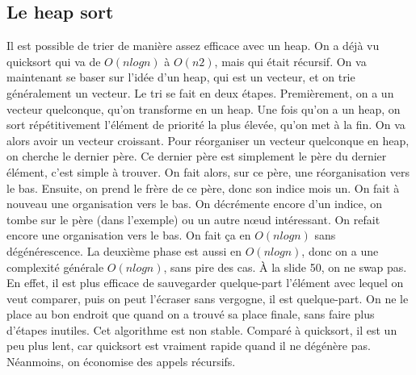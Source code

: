 \documentclass[10pt]{article}
\begin{document}
\subsection{Le heap sort}
Il est possible de trier de manière assez efficace avec un heap. On a déjà vu quicksort qui va de $O(n log n)$ à $O(n2)$, mais qui était récursif. On va maintenant se baser sur l'idée d'un heap, qui est un vecteur, et on trie généralement un vecteur.  
\newline \newline 
Le tri se fait en deux étapes. Premièrement, on a un vecteur quelconque, qu'on transforme en un heap. Une fois qu'on a un heap, on sort répétitivement l'élément de priorité la plus élevée, qu'on met à la fin. On va alors avoir un vecteur croissant. 
\newline \newline 
Pour réorganiser un vecteur quelconque en heap, on cherche le dernier père. Ce dernier père est simplement le père du dernier élément, c'est simple à trouver. On fait alors, sur ce père, une réorganisation vers le bas. Ensuite, on prend le frère de ce père, donc son indice mois un. On fait à nouveau une organisation vers le bas. On décrémente encore d'un indice, on tombe sur le père (dans l'exemple) ou un autre nœud intéressant. On refait encore une organisation vers le bas. On fait ça en $O(n log n)$ sans dégénérescence. 
\newline \newline 
La deuxième phase est aussi en $O(n log n)$, donc on a une complexité générale $O(n log n)$, sans pire des cas.  
\newline \newline 
À la slide 50, on ne swap pas. En effet, il est plus efficace de sauvegarder quelque-part l'élément avec lequel on veut comparer, puis on peut l'écraser sans vergogne, il est quelque-part. On ne le place au bon endroit que quand on a trouvé sa place finale, sans faire plus d'étapes inutiles. 
\newline \newline 
Cet algorithme est non stable. Comparé à quicksort, il est un peu plus lent, car quicksort est vraiment rapide quand il ne dégénère pas. Néanmoins, on économise des appels récursifs.
\newpage
\end{document}
